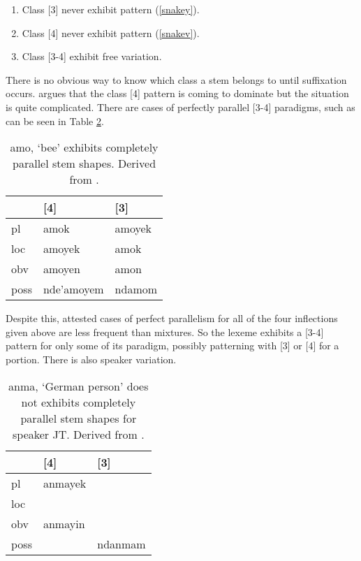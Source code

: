 \begin{enumerate}
\item Class [3] never exhibit pattern (\ref{snakey}).
\item Class [4] never exhibit pattern (\ref{snakev}).
\item Class [3-4] exhibit free variation.
\end{enumerate}

There is no obvious way to know which class a stem belongs to until
suffixation occurs. \citet{lockwood2017potawatomi} argues that the
class [4] pattern is coming to dominate but the situation is quite
complicated. There are cases of perfectly parallel [3-4] paradigms,
such as can be seen in Table \ref{bee}.

\begin{table}[H]
  \centering
  \begin{tabular}{l|ll}
             & [4] & [3] \\\hline
    {\sc pl} & amok & amoyek \\
    {\sc loc} & amoyek & amok \\
    {\sc obv} & amoyen & amon \\
    {\sc poss} & nde'amoyem & ndamom \\
  \end{tabular}
  \caption{{\sc amo}, `bee' exhibits completely parallel stem
    shapes. Derived from \citet[p.\ 86]{lockwood2017potawatomi}.}
  \label{bee}
\end{table}

Despite this, attested cases of perfect parallelism for all of the
four inflections given above are less frequent than mixtures. So the
lexeme exhibits a [3-4] pattern for only some of its paradigm,
possibly patterning with [3] or [4] for a portion. There is also
speaker variation.

\begin{table}[H]
  \centering
  \begin{tabular}{l|ll}
             & [4] & [3] \\\hline
    {\sc pl} & anmayek & \\
    {\sc loc} & & \\
    {\sc obv} & anmayin & \\
    {\sc poss} & & ndanmam \\
  \end{tabular}
  \caption{{\sc anma}, `German person' does not exhibits completely
    parallel stem shapes for speaker JT. Derived from \citet[p.\
    87]{lockwood2017potawatomi}.}
  \label{bee}
\end{table}

